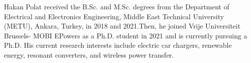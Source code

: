 \documentclass[journal]{IEEEtran}
\begin{document}
\begin{IEEEbiography}
{Hakan Polat} received the B.Sc. and M.Sc. degrees from the Department of Electrical and Electronics Engineering, Middle East Technical University (METU), Ankara, Turkey, in 2018 and 2021.Then, he joined Vrije Universiteit Brussels- MOBI EPowers as a Ph.D. student in 2021 and is currently pursuing a Ph.D. His current research interests include electric car chargers, renewable energy, resonant converters, and wireless power transfer.
\end{IEEEbiography}
\end{document}
